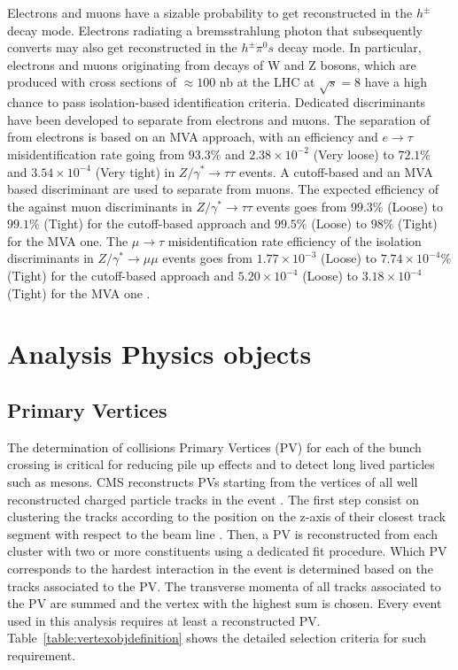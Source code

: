 Electrons and muons have a sizable probability to get reconstructed in the \ensuremath{h^{\pm}} decay mode. Electrons radiating a bremsstrahlung photon that subsequently converts may also get reconstructed in the \ensuremath{h^{\pm}\pi^{0}s} decay mode. In particular, electrons and muons originating from decays of W and Z bosons, which are produced with cross sections of \ensuremath{\approx100} nb at the LHC at \ensuremath{\sqrt{s} = 8} \tev have a high chance to pass isolation-based \hadtau identification criteria. Dedicated discriminants have been developed to separate \hadtau from electrons and muons. The separation of \hadtau from electrons is based on an MVA approach, with an efficiency and \ensuremath{e\to \tau} misidentification rate going from \ensuremath{93.3\%} and \ensuremath{2.38 \times 10^{−2}} (Very loose) to \ensuremath{72.1\%} and \ensuremath{3.54 \times 10^{−4}} (Very tight) in \ensuremath{Z/\gamma^{*} \longrightarrow \tau\tau} events.
A cutoff-based and an MVA based discriminant are used to separate \hadtau from muons. The expected efficiency of the \hadtau against muon discriminants in \ensuremath{Z/\gamma^{*} \longrightarrow \tau\tau} events goes from \ensuremath{99.3\%} (Loose) to \ensuremath{99.1}\% (Tight) for the cutoff-based approach and \ensuremath{99.5\%} (Loose) to \ensuremath{98\%} (Tight) for the MVA one. The \ensuremath{\mu \to \tau} misidentification rate efficiency of the \hadtau isolation discriminants in \ensuremath{Z/\gamma^{*} \longrightarrow \mu\mu} events goes from \ensuremath{1.77 \times 10^{−3}} (Loose) to \ensuremath{7.74 \times 10^{−4}}\% (Tight) for the cutoff-based approach and \ensuremath{5.20 \times 10^{−4}} (Loose) to \ensuremath{3.18 \times 10^{−4}} (Tight) for the MVA one \cite{Khachatryan:2015dfa}.

\section {Analysis Physics objects}

\subsection{Primary Vertices}

The determination of collisions Primary Vertices (PV) for each of the bunch crossing is critical for reducing pile up effects and to detect long lived particles such as mesons. CMS reconstructs PVs starting from the vertices of all well reconstructed charged particle tracks in the event \cite{CMS-PAS-TRK-10-005}. The first step consist on clustering the tracks according to the position on the z-axis of their closest track segment with respect to the beam line \cite{CMS-IN-2011-014}. Then, a PV is reconstructed from each cluster with two or more constituents using a dedicated fit procedure. Which PV corresponds to the hardest interaction in the event is determined based on the tracks associated to the PV. The transverse momenta of all tracks associated to the PV are summed and the vertex with the highest sum is chosen. Every event used in this analysis requires at least a reconstructed PV. Table~\ref{table:vertexobjdefinition} shows the detailed selection criteria for such requirement.

